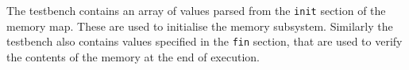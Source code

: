\documentclass[12pt]{article}
\begin{document}
The testbench contains an array of values parsed from the
\texttt{init} section of the memory map. These are used to initialise
the memory subsystem. Similarly the testbench also contains values
specified in the \texttt{fin} section, that are used to verify the
contents of the memory at the end of execution.
\end{document}
